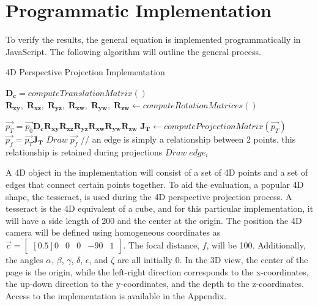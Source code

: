 \documentclass[12pt, letterpaper]{article}
\begin{document}
\section{Programmatic Implementation}
 To verify the results, the general equation is implemented programmatically in JavaScript. The following algorithm will outline the general process.
\begin{algorithm}[H]
\caption{4D Perspective Projection Implementation}
\begin{algorithmic}[1]
\STATE $\mathbf{D_c} = computeTranslationMatrix()$
\STATE $\mathbf{R_{xy}},\; \mathbf{R_{xz}},\; \mathbf{R_{yz}},\; \mathbf{R_{xw}},\; \mathbf{R_{yw}},\; \mathbf{R_{zw}} \leftarrow computeRotationMatrices()$

    \STATE $\vec{p_T} = \vec{p_0}\mathbf{D_c}\mathbf{R_{xy}}\mathbf{R_{xz}}\mathbf{R_{yz}}\mathbf{R_{xw}}\mathbf{R_{yw}}\mathbf{R_{zw}}$
    \STATE $\mathbf{J_T} \leftarrow computeProjectionMatrix(\vec{p_T})$
    \STATE $\vec{p_f} = \vec{p_T} \mathbf{J_T}$
    \STATE $Draw\; \vec{p_f}$
\ENDFOR
{}
    \STATE // an edge is simply a relationship between 2 points, this relationship is retained during projections 
    \STATE $Draw\; edge_{i}$
\ENDFOR
\end{algorithmic}
\end{algorithm}
\noindent A 4D object in the implementation will consist of a set of 4D points and a set of edges that connect certain points together. To aid the evaluation, a popular 4D shape, the tesseract, is used during the 4D perspective projection process. A tesseract is the 4D equivalent of a cube, and for this particular implementation, it will have a side length of 200 and the center at the origin. The position the 4D camera will be defined using homogeneous coordinates as $\vec{c} = \begin{bmatrix}[0.5] 0 & 0 & 0& -90 & 1\end{bmatrix}$. The focal distance, $f$, will be 100. Additionally, the angles $\alpha$, $\beta$, $\gamma$, $\delta$, $\epsilon$, and $\zeta$ are all initially 0. In the 3D view, the center of the page is the origin, while the left-right direction corresponds to the x-coordinates, the up-down direction to the y-coordinates, and the depth to the z-coordinates. Access to the implementation is available in the Appendix.
\end{document}
